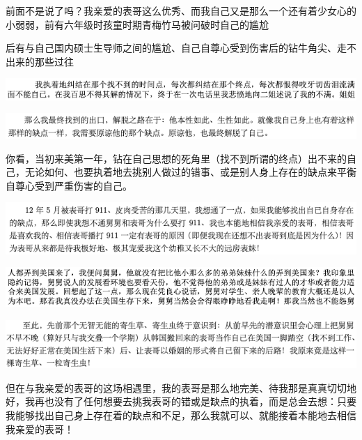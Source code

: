\documentclass[9pt, b5paper]{article}
\begin{document}
前面不是说了吗？我亲爱的表哥这么优秀、而我自己又是那么一个还有着少女心的小弱弱，前有六年级时孩童时期青梅竹马被问破时自己的尴尬

后有与自己国内硕士生导师之间的尴尬、自己自尊心受到伤害后的钻牛角尖、走不出来的那些过往

\begin{center}
\includegraphics[width=.9\linewidth]{./pic/backups_plans_20210424_085829.png}
\end{center}

\begin{center}
\includegraphics[width=.9\linewidth]{./pic/backups_plans_20210424_091759.png}
\end{center}

你看，当初来美第一年，钻在自己思想的死角里（找不到所谓的终点）出不来的自己，无论如何、也要执着地去挑别人做过的错事、或是别人身上存在的缺点来平衡自尊心受到严重伤害的自己。

\begin{center}
\includegraphics[width=.9\linewidth]{./pic/backups_plans_20210424_085705.png}
\end{center}

\begin{center}
\includegraphics[width=.9\linewidth]{./pic/backups_plans_20210424_091947.png}
\end{center}

\begin{center}
\includegraphics[width=.9\linewidth]{./pic/backups_plans_20210424_091855.png}
\end{center}

但在与我亲爱的表哥的这场相遇里，我的表哥是那么地完美、待我那是真真切切地好，我再也没有了任何想要去挑我表哥的错或是缺点的执着，而是总会去想：只要我能够找出自己身上存在着的缺点和不足，那么我就可以、就能接着本能地去相信我亲爱的表哥！
\end{document}
